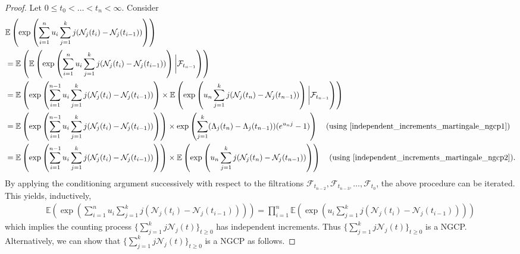 \documentclass[11pt,oneside,reqno]{amsart}
\theoremstyle{definition}
\theoremstyle{remarkstyle}
\begin{document}
\begin{proof}
    Let $0\le t_0<\ldots<t_n<\infty$. Consider
    \begin{align}
        &\mathbb{E}\left(\exp\left(\sum_{i=1}^{n}u_i\sum_{j=1}^{k}j(\mathcal{N}_j(t_i)-\mathcal{N}_j(t_{i-1}))\right)\right)\nonumber\\
        &=\mathbb{E}\left(\mathbb{E}\left(\exp\left(\sum_{i=1}^{n}u_i\sum_{j=1}^{k}j(\mathcal{N}_j(t_i)-\mathcal{N}_j(t_{i-1}))\right)\bigg|\mathcal{F}_{t_{n-1}}\right)\right)\nonumber\\
        &=\mathbb{E}\left(\exp\left(\sum_{i=1}^{n-1}u_i\sum_{j=1}^{k}j(\mathcal{N}_j(t_i)-\mathcal{N}_j(t_{i-1}))\right)\times\mathbb{E}\left(\exp\left(u_n\sum_{j=1}^{k}j(\mathcal{N}_j(t_n)-\mathcal{N}_j(t_{n-1}))\right)\bigg|\mathcal{F}_{t_{n-1}}\right)\right)\nonumber\\
        &=\mathbb{E}\left(\exp\left(\sum_{i=1}^{n-1}u_i\sum_{j=1}^{k}j(\mathcal{N}_j(t_i)-\mathcal{N}_j(t_{i-1}))\right)\right)\times\exp\left(\sum_{j=1}^{k}(\Lambda_j(t_n)-\Lambda_j(t_{n-1}))(e^{u_nj}-1)\right)\quad(\text{using}~\eqref{independent_increments_martingale_ngcp1})\nonumber\\
        &=\mathbb{E}\left(\exp\left(\sum_{i=1}^{n-1}u_i\sum_{j=1}^{k}j(\mathcal{N}_j(t_i)-\mathcal{N}_j(t_{i-1}))\right)\right)\times\mathbb{E}\left(\exp\left(u_n\sum_{j=1}^{k}j(\mathcal{N}_j(t_n)-\mathcal{N}_j(t_{n-1}))\right)\right)\quad(\text{using}~\eqref{independent_increments_martingale_ngcp2}).\nonumber
    \end{align}
 By applying the conditioning argument successively with respect to the filtrations $\mathcal{F}_{t_{n-2}}, \mathcal{F}_{t_{n-3},}\dots,\mathcal{F}_{t_{0}}$, the above procedure can be iterated. This yields, inductively, 
    \begin{align}
        \mathbb{E}\left(\exp\left(\sum_{i=1}^{n}u_i\sum_{j=1}^{k}j(\mathcal{N}_j(t_i)-\mathcal{N}_j(t_{i-1}))\right)\right)=\prod_{i=1}^{n}\mathbb{E}\left(\exp\left(u_i\sum_{j=1}^{k}j(\mathcal{N}_j(t_i)-\mathcal{N}_j(t_{i-1}))\right)\right)\nonumber
    \end{align}
    which implies the counting process $\{\sum_{j=1}^{k}j\mathcal{N}_j(t)\}_{t\ge 0}$ has independent increments. Thus $\{\sum_{j=1}^{k}j\mathcal{N}_j(t)\}_{t\ge 0}$ is a NGCP. Alternatively, we can show that $\{\sum_{j=1}^{k}j\mathcal{N}_j(t)\}_{t\ge 0}$ is a NGCP as follows. 
    

\end{proof}
\end{document}
